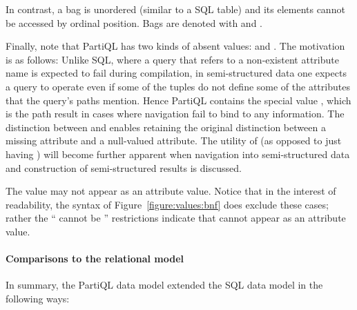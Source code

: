In contrast, a bag is unordered (similar to a SQL table) and its elements cannot
be accessed by ordinal position. Bags are denoted with \gt{\ob} and \gt{\cb}.

Finally, note that PartiQL has two kinds of absent values: \NULL and
\MISSING. The motivation is as follows: Unlike SQL, where a query that
refers to a non-existent attribute name is expected to fail during compilation,
in semi-structured data one expects a query to operate even if some of the tuples
do not define some of the attributes that the query's paths mention. Hence
PartiQL contains the special value \MISSING {}, which is
the path result in cases where navigation fail to bind to any information. The
distinction between \MISSING and \NULL enables retaining the original
distinction between a missing attribute and a null-valued attribute. The utility
of \MISSING (as opposed to just having \NULL) will become further
apparent when navigation into semi-structured data and construction of
semi-structured results is discussed.

The value \MISSING may not appear as an attribute value. Notice that in the
interest of readability, the syntax of Figure~\ref{figure:values:bnf} does
exclude these cases; rather the `` cannot be \MISSING''
restrictions  indicate that \MISSING cannot appear
as an attribute value.

\paragraph{Comparisons to the relational model} In summary, the PartiQL
data model extended the SQL data model in the following ways:

